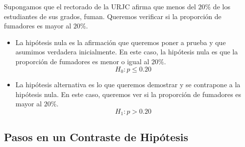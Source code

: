 \documentclass[
  letterpaper,
  DIV=11,
  numbers=noendperiod]{scrreprt}
\begin{document}
\begin{tcolorbox}[enhanced jigsaw, arc=.35mm, breakable, coltitle=black, left=2mm, opacityback=0, bottomtitle=1mm, colbacktitle=quarto-callout-tip-color!10!white, title=\textcolor{quarto-callout-tip-color}{\faLightbulb}\hspace{0.5em}{Ejemplo \(H_0\) vs \(H_1\). Proporción poblacional}, titlerule=0mm, colback=white, colframe=quarto-callout-tip-color-frame, bottomrule=.15mm, rightrule=.15mm, opacitybacktitle=0.6, toptitle=1mm, toprule=.15mm, leftrule=.75mm]

Supongamos que el rectorado de la URJC afirma que menos del \(20\%\) de
los estudiantes de sus grados, fuman. Queremos verificar si la
proporción de fumadores es mayor al \(20\%\).

\begin{itemize}
\item
  La hipótesis nula es la afirmación que queremos poner a prueba y que
  asumimos verdadera inicialmente. En este caso, la hipótesis nula es
  que la proporción de fumadores es menor o igual al \(20\%\). \[
   H_0: p \leq 0.20
  \]
\item
  La hipótesis alternativa es lo que queremos demostrar y se contrapone
  a la hipótesis nula. En este caso, queremos ver si la proporción de
  fumadores es mayor al \(20\%\). \[
   H_1: p > 0.20
  \]
\end{itemize}

\end{tcolorbox}

\hypertarget{pasos-en-un-contraste-de-hipuxf3tesis}{%
\subsection{Pasos en un Contraste de
Hipótesis}\label{pasos-en-un-contraste-de-hipuxf3tesis}}
\end{document}
